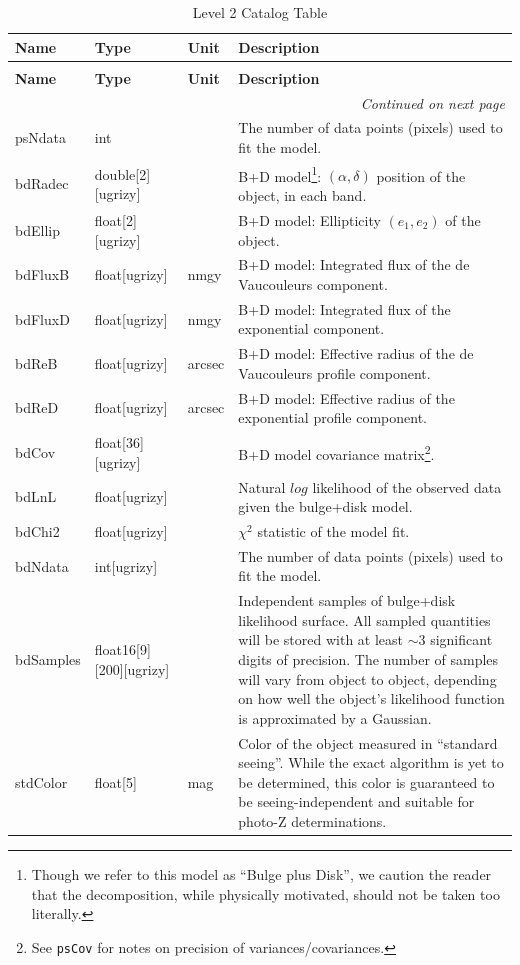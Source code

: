 \documentclass[SE,lsstdraft,toc]{lsstdoc}
\newenvironment{schema}[3]{%
\setlength\LTleft{0pt}
\setlength\LTright{\fill}
\begin{longtable}{p{0.2\textwidth}p{0.14\textwidth}p{0.14\textwidth}p{0.41\textwidth}}

\caption[#1]{#2\label{#3}}\\

\hline \textbf{Name} & \textbf{Type} & \textbf{Unit} & \textbf{Description}\\ \hline
\endfirsthead

\caption[#1]{#2}\\

\hline \textbf{Name} & \textbf{Type} & \textbf{Unit} & \textbf{Description}\\ \hline
\endhead

\hline \multicolumn{4}{r}{\emph{Continued on next page}} \\
\endfoot

\hline\hline
\endlastfoot
}{%
\hline
\end{longtable}
}
\begin{document}
\begin{schema}{\Object Table}{Level 2 Catalog \Object Table}{tbl:objectTable}
psNdata & int & ~ & The number of data points (pixels) used to fit the model. \\


bdRadec & double[2][ugrizy] & ~ & B+D model\footnote{Though we refer to this model as ``Bulge plus Disk'', we caution the reader that the decomposition, while physically motivated, should not be taken too literally.}: $(\alpha, \delta)$ position of the object, in each band. \\

bdEllip & float[2][ugrizy] & ~ & B+D model: Ellipticity $(e_1, e_2)$ of the object. \\

bdFluxB & float[ugrizy] & nmgy & B+D model: Integrated flux of the de Vaucouleurs component. \\

bdFluxD & float[ugrizy] & nmgy & B+D model: Integrated flux of the exponential component. \\

bdReB & float[ugrizy] & arcsec & B+D model: Effective radius of the de Vaucouleurs profile component. \\

bdReD & float[ugrizy] & arcsec & B+D model: Effective radius of the exponential profile component. \\

bdCov & float[36][ugrizy] & ~ & B+D model covariance matrix\footnote{See \texttt{psCov} for notes on precision of variances/covariances.}. \\

bdLnL & float[ugrizy] & ~ & Natural $log$ likelihood of the observed data given the bulge+disk model. \\

bdChi2 & float[ugrizy] & ~ & $\chi^2$ statistic of the model fit. \\

bdNdata & int[ugrizy] & ~ & The number of data points (pixels) used to fit the model. \\

bdSamples & float16[9][200][ugrizy] & ~ & Independent samples of bulge+disk likelihood surface. All sampled quantities will be stored with at least $\sim 3$ significant digits of precision. The number of samples will vary from object to object, depending on how well the object's likelihood function is approximated by a Gaussian.\\

stdColor & float[5] & mag & Color of the object measured in ``standard seeing''. While the exact algorithm is yet to be determined, this color is guaranteed to be seeing-independent and suitable for photo-Z determinations.\\


\end{schema}
\end{document}
